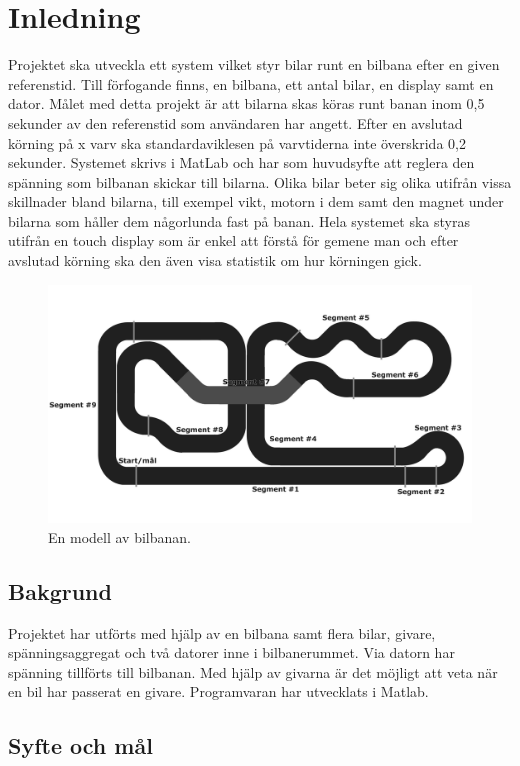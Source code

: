\section{Inledning}
Projektet ska utveckla ett system vilket styr bilar runt en bilbana efter en given referenstid. Till förfogande finns, en bilbana, ett antal bilar, en display samt en dator.
Målet med detta projekt är att bilarna skas köras runt banan inom 0,5 sekunder av den referenstid som användaren har angett. Efter en avslutad
körning på x varv ska standardaviklesen på varvtiderna inte överskrida 0,2 sekunder. Systemet skrivs i MatLab och har som huvudsyfte att reglera den spänning som bilbanan skickar
till bilarna. Olika bilar beter sig olika utifrån vissa skillnader bland bilarna, till exempel vikt, motorn i dem samt den magnet under bilarna som håller dem någorlunda fast på banan. 
Hela systemet ska styras utifrån en touch display som är enkel att förstå för gemene man och efter avslutad körning ska den även visa statistik om hur körningen gick. 
\begin{figure}
	\centering
	\includegraphics[width=\linewidth] {Figures/BanaModell}
	\caption{En modell av bilbanan.}
	\label{fig:bilbanan}
\end{figure}

\subsection{Bakgrund} 

Projektet har utförts med hjälp av en bilbana samt flera bilar, givare,
spänningsaggregat och två datorer inne i bilbanerummet. Via datorn har spänning
tillförts till bilbanan. Med hjälp av givarna är det möjligt att veta när en bil
har passerat en givare. Programvaran har utvecklats i Matlab.

\subsection{Syfte och mål}

